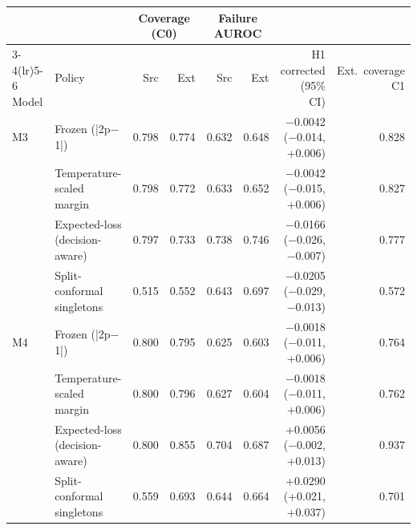\begin{tabular}{llrrrrrr}
\toprule
 & & \multicolumn{2}{c}{Coverage (C0)} & \multicolumn{2}{c}{Failure AUROC} & & \\
\cmidrule(lr){3-4}\cmidrule(lr){5-6}
Model & Policy & Src & Ext & Src & Ext & H1 corrected (95\% CI) & Ext.\ coverage C1\\
\midrule
M3 & Frozen (|2p$-$1|) & 0.798 & 0.774 & 0.632 & 0.648 & $-$0.0042 ($-$0.014, +0.006) & 0.828\\
 & Temperature-scaled margin & 0.798 & 0.772 & 0.633 & 0.652 & $-$0.0042 ($-$0.015, +0.006) & 0.827\\
 & Expected-loss (decision-aware) & 0.797 & 0.733 & 0.738 & 0.746 & $-$0.0166 ($-$0.026, $-$0.007) & 0.777\\
 & Split-conformal singletons & 0.515 & 0.552 & 0.643 & 0.697 & $-$0.0205 ($-$0.029, $-$0.013) & 0.572\\
\addlinespace
M4 & Frozen (|2p$-$1|) & 0.800 & 0.795 & 0.625 & 0.603 & $-$0.0018 ($-$0.011, +0.006) & 0.764\\
 & Temperature-scaled margin & 0.800 & 0.796 & 0.627 & 0.604 & $-$0.0018 ($-$0.011, +0.006) & 0.762\\
 & Expected-loss (decision-aware) & 0.800 & 0.855 & 0.704 & 0.687 & +0.0056 ($-$0.002, +0.013) & 0.937\\
 & Split-conformal singletons & 0.559 & 0.693 & 0.644 & 0.664 & +0.0290 (+0.021, +0.037) & 0.701\\
\bottomrule
\end{tabular}
